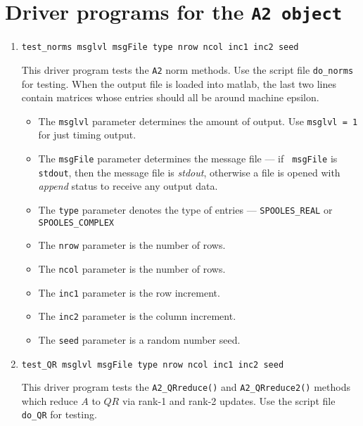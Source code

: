\par
\section{Driver programs for the {\tt A2 object}}
\label{section:A2:drivers}
\par
\begin{enumerate}
\item
\begin{verbatim}
test_norms msglvl msgFile type nrow ncol inc1 inc2 seed
\end{verbatim}
This driver program tests the {\tt A2} norm methods.
Use the script file {\tt do\_norms} for testing.
When the output file is loaded into matlab,
the last two lines contain matrices whose
entries should all be around machine epsilon.
\par
\begin{itemize}
\item
The {\tt msglvl} parameter determines the amount of output.
Use {\tt msglvl = 1} for just timing output.
\item
The {\tt msgFile} parameter determines the message file --- if {\tt
msgFile} is {\tt stdout}, then the message file is {\it stdout},
otherwise a file is opened with {\it append} status to receive any
output data.
\item
The {\tt type} parameter denotes the type of entries ---
{\tt SPOOLES\_REAL} or {\tt SPOOLES\_COMPLEX} 
\item
The {\tt nrow} parameter is the number of rows.
\item
The {\tt ncol} parameter is the number of rows.
\item
The {\tt inc1} parameter is the row increment.
\item
The {\tt inc2} parameter is the column increment.
\item
The {\tt seed} parameter is a random number seed.
\end{itemize}
\item
\begin{verbatim}
test_QR msglvl msgFile type nrow ncol inc1 inc2 seed
\end{verbatim}
This driver program tests the {\tt A2\_QRreduce()} and
{\tt A2\_QRreduce2()} methods which reduce $A$ to $QR$
via rank-1 and rank-2 updates.
Use the script file {\tt do\_QR} for testing.

\end{enumerate}
